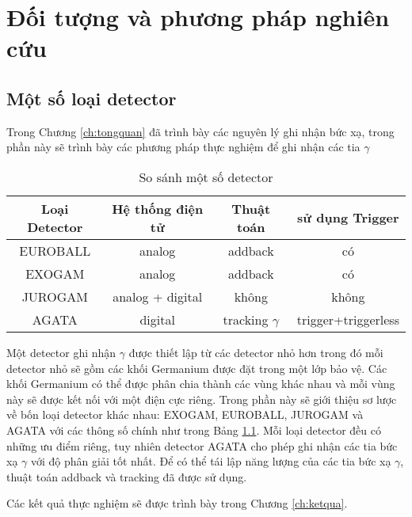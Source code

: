 \chapter{Đối tượng và phương pháp nghiên cứu}
\label{ch:doituongnghiencuu}
\minitoc


\section{Một số loại detector}

Trong Chương \ref{ch:tongquan} đã trình bày các nguyên lý ghi nhận bức xạ, trong phần này sẽ trình bày các phương pháp thực nghiệm để ghi nhận các tia $\gamma$

\begin{table}[!h]
\caption{So sánh một số detector}
\centering
\begin{tabular}{|c|c|c|c|}
\hline 
Loại Detector & Hệ thống điện tử & Thuật toán & sử dụng Trigger \\ 
\hline 
EUROBALL & analog & addback & có \\ 
\hline 
EXOGAM & analog & addback & có \\ 
\hline 
JUROGAM & analog + digital & không & không \\ 
\hline 
AGATA & digital & tracking $\gamma$ & trigger+triggerless \\ 
\hline 
\end{tabular} 
\label{table:detector}
\end{table}

Một detector ghi nhận $\gamma$ được thiết lập từ các detector nhỏ hơn trong đó mỗi detector nhỏ sẽ gồm các khối Germanium  được đặt trong một lớp bảo vệ. Các khối Germanium có thể được phân chia thành các vùng khác nhau  và mỗi vùng này sẽ được kết nối với một điện cực riêng. Trong phần này sẽ giới thiệu sơ lược về bốn loại detector khác nhau: EXOGAM, EUROBALL, JUROGAM và AGATA \cite{bib_Bazzaco, bib_Simpson}  với các thông số chính như trong Bảng \ref{table:detector}. Mỗi loại detector đều có những ưu điểm riêng, tuy nhiên detector AGATA cho phép ghi nhận các tia bức xạ  $\gamma$ với độ phân giải tốt nhất. Để có thể tái lập năng lượng của các tia bức xạ $\gamma$, thuật toán addback và tracking đã được sử dụng.

Các kết quả thực nghiệm sẽ được trình bày trong Chương \ref{ch:ketqua}.

\renewcommand\bibname{Tài liệu tham khảo chương \thechapter}

